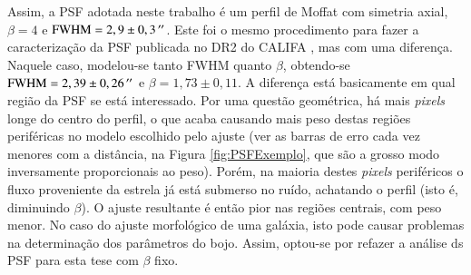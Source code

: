 Assim, a PSF adotada neste trabalho é um perfil de Moffat com simetria axial,
$\beta\!=\!4$ e $\mathrm{FWHM}=2,9 \pm 0,3\,^{\prime\prime}$. Este foi o mesmo
procedimento para fazer a caracterização da PSF publicada no DR2 do CALIFA
\citep{GarciaBenito2015}, mas com uma diferença. Naquele caso, modelou-se tanto
FWHM quanto $\beta$, obtendo-se $\mathrm{FWHM}=2,39 \pm 0,26\,^{\prime\prime}$ e
$\beta=1,73 \pm 0,11$. A diferença está basicamente em qual região da PSF se
está interessado. Por uma questão geométrica, há mais {\em pixels} longe do
centro do perfil, o que acaba causando mais peso destas regiões periféricas no
modelo escolhido pelo ajuste (ver as barras de erro cada vez menores com a
distância, na Figura \ref{fig:PSFExemplo}, que são a grosso modo inversamente
proporcionais ao peso). Porém, na maioria destes {\em pixels} periféricos o
fluxo proveniente da estrela já está submerso no ruído, achatando o perfil (isto
é, diminuindo $\beta$). O ajuste resultante é então pior nas regiões centrais,
com peso menor.
No caso do ajuste morfológico de uma galáxia, isto pode causar problemas na
determinação dos parâmetros do bojo. Assim, optou-se por refazer a análise ds
PSF para esta tese com $\beta$ fixo.

